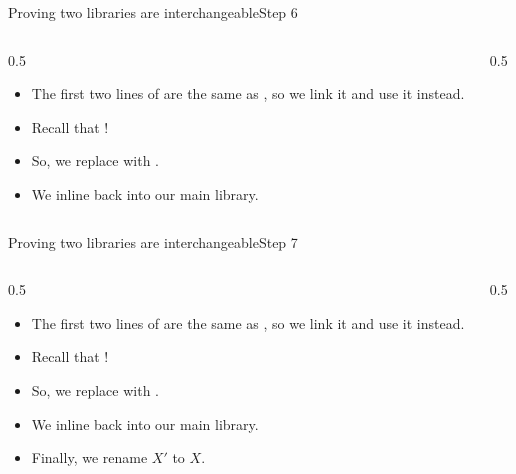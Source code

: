 \ifdefined\PRESENTATION\else\PassOptionsToClass{handout}{beamer}\fi\documentclass[aspectratio=169, lualatex]{beamer}
\begin{document}
\begin{frame}{Proving two libraries are interchangeable}{Step 6}
	\begin{columns}[c]
		\begin{column}{0.5\textwidth}
			\begin{itemize}
				\item The first two lines of  are the same as , so we link it and use it instead.
				\item Recall that  \interchangeable{} !
				\item So, we replace  with .
				\item We inline  back into our main library.
			\end{itemize}
		\end{column}
		\begin{column}{0.5\textwidth}
			\begin{center}
			\end{center}
		\end{column}
	\end{columns}
\end{frame}

\begin{frame}{Proving two libraries are interchangeable}{Step 7}
	\begin{columns}[c]
		\begin{column}{0.5\textwidth}
			\begin{itemize}
				\item The first two lines of  are the same as , so we link it and use it instead.
				\item Recall that  \interchangeable{} !
				\item So, we replace  with .
				\item We inline  back into our main library.
				\item Finally, we rename $X'$ to $X$.
			\end{itemize}
		\end{column}
		\begin{column}{0.5\textwidth}
			\begin{center}
			\end{center}
		\end{column}
	\end{columns}
\end{frame}
\end{document}

